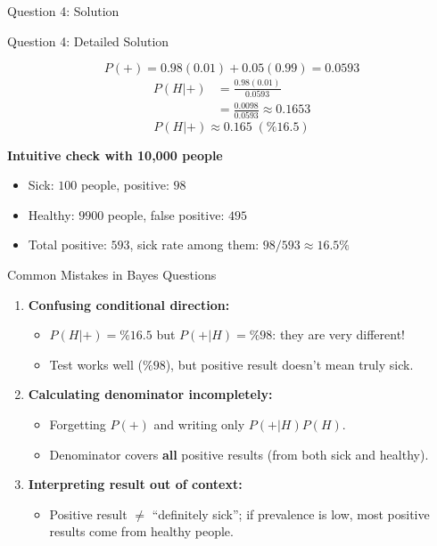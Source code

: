 \documentclass[light]{lutbeamer}
\begin{document}
\begin{frame}{Question 4: Solution}
    \vspace{5cm}
\end{frame}

\begin{frame}[allowframebreaks]{Question 4: Detailed Solution}
    \large
    {\color{red}
    \[
    P(+)=0.98(0.01)+0.05(0.99)=0.0593
    \]
    \begin{align*}
    P(H|+) &= \frac{0.98(0.01)}{0.0593} \\
           &= \frac{0.0098}{0.0593}\approx 0.1653
    \end{align*}
    \[
    \boxed{P(H|+)\approx 0.165\;(\%16.5)}
    \]

    \framebreak
    \textbf{Intuitive check with 10,000 people}
    \begin{itemize}
        \item Sick: \(100\) people, positive: \(98\)
        \item Healthy: \(9900\) people, false positive: \(495\)
        \item Total positive: \(593\), sick rate among them: \(98/593\approx 16.5\%\)
    \end{itemize}
    }
\end{frame}

\begin{frame}{Common Mistakes in Bayes Questions}
    \begin{enumerate}
        \item \textbf{Confusing conditional direction:}
        \begin{itemize}
            \item $P(H|+)=\%16.5$ but $P(+|H)=\%98$: they are very different!
            \item Test works well ($\%98$), but positive result doesn't mean truly sick.
        \end{itemize}
        \item \textbf{Calculating denominator incompletely:}
        \begin{itemize}
            \item Forgetting $P(+)$ and writing only $P(+|H)P(H)$.
            \item Denominator covers \textbf{all} positive results (from both sick and healthy).
        \end{itemize}
        \item \textbf{Interpreting result out of context:}
        \begin{itemize}
            \item Positive result $\neq$ ``definitely sick''; if prevalence is low, most positive results come from healthy people.
        \end{itemize}
    \end{enumerate}
\end{frame}
\end{document}

